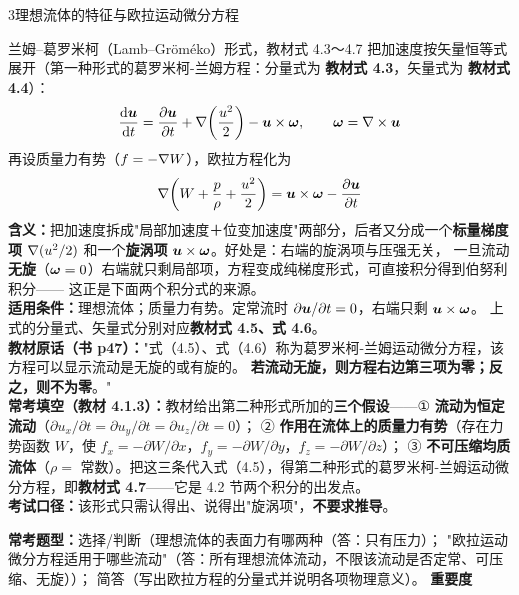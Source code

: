 \begin{kaodian}{3}{理想流体的特征与欧拉运动微分方程}
\begin{gongshi}{兰姆--葛罗米柯（Lamb--Gr\"om\'eko）形式，教材式 4.3～4.7}
把加速度按矢量恒等式展开（第一种形式的葛罗米柯-兰姆方程：分量式为 \textbf{教材式 4.3}，矢量式为 \textbf{教材式 4.4}）：
\[ \frac{\mathrm{d} \bm{u}}{\mathrm{d} t}=\frac{\partial \bm{u}}{\partial t}+\nabla\!\left(\frac{u^2}{2}\right)-\bm{u}\times\bm{\omega},\qquad \bm{\omega}=\nabla\times\bm{u} \]
再设质量力有势（$f=-\nabla W$），欧拉方程化为
\[ \nabla\!\left(W+\frac{p}{\rho}+\frac{u^2}{2}\right)=\bm{u}\times\bm{\omega}-\frac{\partial \bm{u}}{\partial t} \]
\textbf{含义：}把加速度拆成"局部加速度＋位变加速度"两部分，后者又分成一个\textbf{标量梯度项} $\nabla(u^2/2)$
和一个\textbf{旋涡项} $\bm{u}\times\bm{\omega}$。好处是：右端的旋涡项与压强无关，
一旦流动\textbf{无旋}（$\bm{\omega}=0$）右端就只剩局部项，方程变成纯梯度形式，可直接积分得到伯努利积分——
这正是下面两个积分式的来源。\\
\textbf{适用条件：}理想流体；质量力有势。定常流时 $\partial\bm{u}/\partial t=0$，右端只剩 $\bm{u}\times\bm{\omega}$。
上式的分量式、矢量式分别对应\textbf{教材式 4.5、式 4.6}。\\
\textbf{教材原话（书 p47）：}"式（4.5）、式（4.6）称为葛罗米柯-兰姆运动微分方程，该方程可以显示流动是无旋的或有旋的。
\textbf{若流动无旋，则方程右边第三项为零；反之，则不为零}。"\\
\textbf{常考填空（教材 4.1.3）：}教材给出第二种形式所加的\textbf{三个假设}——① \textbf{流动为恒定流动}（$\partial u_x/\partial t=\partial u_y/\partial t=\partial u_z/\partial t=0$）；
② \textbf{作用在流体上的质量力有势}（存在力势函数 $W$，使 $f_x=-\partial W/\partial x$，$f_y=-\partial W/\partial y$，$f_z=-\partial W/\partial z$）；
③ \textbf{不可压缩均质流体}（$\rho=$ 常数）。把这三条代入式（4.5），得第二种形式的葛罗米柯-兰姆运动微分方程，即\textbf{教材式 4.7}——它是 4.2 节两个积分的出发点。\\
\textbf{考试口径：}该形式只需认得出、说得出"旋涡项"，\textbf{不要求推导}。
\end{gongshi}

\textbf{常考题型：}选择/判断（理想流体的表面力有哪两种（答：只有压力）；
"欧拉运动微分方程适用于哪些流动"（答：所有理想流体流动，不限该流动是否定常、可压缩、无旋））；
简答（写出欧拉方程的分量式并说明各项物理意义）。
\textbf{重要度 }\quad{}\quad{}


\end{kaodian}
